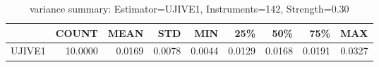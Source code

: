\begin{table}[ht]
\centering
\caption{variance summary: Estimator=UJIVE1, Instruments=142, Strength=0.30}
\begin{tabular}{lrrrrrrrr}
\toprule
 & COUNT & MEAN & STD & MIN & 25\% & 50\% & 75\% & MAX \\
\midrule
UJIVE1 & 10.0000 & 0.0169 & 0.0078 & 0.0044 & 0.0129 & 0.0168 & 0.0191 & 0.0327 \\
\bottomrule
\end{tabular}
\end{table}
